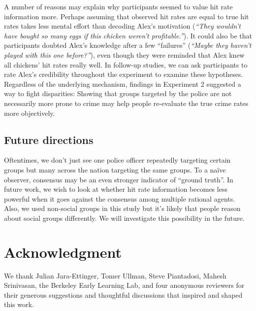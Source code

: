 \documentclass[10pt,letterpaper]{article}
\begin{document}
A number of reasons may explain why participants seemed to value hit rate information more. Perhaps assuming that observed hit rates are equal to true hit rates takes less mental effort than decoding Alex's motivation (\emph{``They wouldn't have bought so many eggs if this chicken weren't profitable.''}). It could also be that participants doubted Alex's knowledge after a few ``failures'' (\emph{``Maybe they haven't played with this one before?''}), even though they were reminded that Alex knew all chickens' hit rates really well. In follow-up studies, we can ask participants to rate Alex's credibility throughout the experiment to examine these hypotheses. Regardless of the underlying mechanism, findings in Experiment 2 suggested a way to fight disparities: Showing that groups targeted by the police are not necessarily more prone to crime may help people re-evaluate the true crime rates more objectively. 

\subsection{Future directions}
Oftentimes, we don't just see one police officer repeatedly targeting certain groups but many across the nation targeting the same groups. To a na\"ive observer, consensus may be an even stronger indicator of ``ground truth''. In future work, we wish to look at whether hit rate information becomes less powerful when it goes against the consensus among multiple rational agents. Also, we used non-social groups in this study but it's likely that people reason about social groups differently. We will investigate this possibility in the future.

\section{Acknowledgment}
We thank Julian Jara-Ettinger, Tomer Ullman, Steve Piantadosi, Mahesh Srinivasan, the Berkeley Early Learning Lab, and four anonymous reviewers for their generous suggestions and thoughtful discussions that inspired and shaped this work.

\vskip 3mm



\renewcommand\bibliographytypesize{\footnotesize}
\setlength{\bibleftmargin}{.125in}
\setlength{\bibindent}{-\bibleftmargin}



\nocite{liu19}
\end{document}
